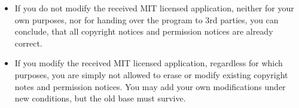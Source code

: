 \begin{itemize}
  \item If you do not modify the received MIT licensed application, neither for
  your own purposes, nor for handing over the program to 3rd parties, you can
  conclude, that all copyright notices and permission notices are already correct.
  \item If you modify the received MIT licensed application, regardless for
  which purposes, you are simply not allowed to erase or modify existing
  copyright notes and permission notices. You may add your own modifications
  under new conditions, but the old base must survive.
\end{itemize}

%
